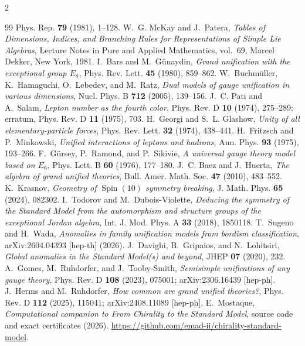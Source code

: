 \documentclass[11pt]{article}
\theoremstyle{remark}
\begin{document}
\begin{multicols}{2}
\begin{thebibliography}{99}
Phys. Rep. \textbf{79} (1981), 1--128.
W.~G. McKay and J.~Patera,
\emph{Tables of Dimensions, Indices, and Branching Rules for
Representations of Simple Lie Algebras},
Lecture Notes in Pure and Applied Mathematics, vol.~69,
Marcel Dekker, New York, 1981.
I.~Bars and M.~G\"unaydin,
\emph{Grand unification with the exceptional group \(E_8\)},
Phys. Rev. Lett. \textbf{45} (1980), 859--862.
W.~Buchm\"uller, K.~Hamaguchi, O.~Lebedev, and M.~Ratz,
\emph{Dual models of gauge unification in various dimensions},
Nucl. Phys. B \textbf{712} (2005), 139--156.
J.~C. Pati and A.~Salam,
\emph{Lepton number as the fourth color},
Phys. Rev. D \textbf{10} (1974), 275--289;
erratum, Phys. Rev. D \textbf{11} (1975), 703.
H.~Georgi and S.~L. Glashow,
\emph{Unity of all elementary-particle forces},
Phys. Rev. Lett. \textbf{32} (1974), 438--441.
H.~Fritzsch and P.~Minkowski,
\emph{Unified interactions of leptons and hadrons},
Ann. Phys. \textbf{93} (1975), 193--266.
F.~G\"ursey, P.~Ramond, and P.~Sikivie,
\emph{A universal gauge theory model based on \(E_6\)},
Phys. Lett. B \textbf{60} (1976), 177--180.
J.~C. Baez and J.~Huerta,
\emph{The algebra of grand unified theories},
Bull. Amer. Math. Soc. \textbf{47} (2010), 483--552.
K.~Krasnov,
\emph{Geometry of \(\operatorname{Spin}(10)\) symmetry breaking},
J. Math. Phys. \textbf{65} (2024), 082302.
I.~Todorov and M.~Dubois-Violette,
\emph{Deducing the symmetry of the Standard Model from the automorphism and
structure groups of the exceptional Jordan algebra},
Int. J. Mod. Phys. A \textbf{33} (2018), 1850118.
T.~Sugeno and H.~Wada,
\emph{Anomalies in family unification models from bordism classification},
arXiv:2604.04393 [hep-th] (2026).
J.~Davighi, B.~Gripaios, and N.~Lohitsiri,
\emph{Global anomalies in the Standard Model(s) and beyond},
JHEP \textbf{07} (2020), 232.
A.~Gomes, M.~Ruhdorfer, and J.~Tooby-Smith,
\emph{Semisimple unifications of any gauge theory},
Phys. Rev. D \textbf{108} (2023), 075001;
arXiv:2306.16439 [hep-ph].
J.~Herms and M.~Ruhdorfer,
\emph{How common are grand unified theories?},
Phys. Rev. D \textbf{112} (2025), 115041;
arXiv:2408.11089 [hep-ph].
E.~Mostaque,
\emph{Computational companion to From Chirality to the Standard Model},
source code and exact certificates (2026).
\url{https://github.com/emad-ii/chirality-standard-model}.
\end{thebibliography}
\end{multicols}
\end{document}
